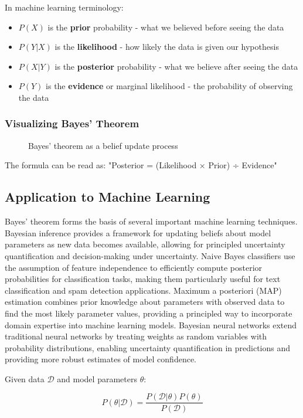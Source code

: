 In machine learning terminology:
\begin{itemize}
    \item $P(X)$ is the \textbf{prior} probability - what we believed before seeing the data
    \item $P(Y|X)$ is the \textbf{likelihood} - how likely the data is given our hypothesis
    \item $P(X|Y)$ is the \textbf{posterior} probability - what we believe after seeing the data
    \item $P(Y)$ is the \textbf{evidence} or marginal likelihood - the probability of observing the data
\end{itemize}

\subsubsection{Visualizing Bayes' Theorem}

\begin{figure}[h]
\centering
{}
\caption{Bayes' theorem as a belief update process}
\label{fig:bayes-process}
\end{figure}

The formula can be read as: "Posterior = (Likelihood × Prior) ÷ Evidence"

\subsection{Application to Machine Learning}

Bayes' theorem forms the basis of several important machine learning techniques. Bayesian inference provides a framework for updating beliefs about model parameters as new data becomes available, allowing for principled uncertainty quantification and decision-making under uncertainty. Naive Bayes classifiers use the assumption of feature independence to efficiently compute posterior probabilities for classification tasks, making them particularly useful for text classification and spam detection applications. Maximum a posteriori (MAP) estimation combines prior knowledge about parameters with observed data to find the most likely parameter values, providing a principled way to incorporate domain expertise into machine learning models. Bayesian neural networks extend traditional neural networks by treating weights as random variables with probability distributions, enabling uncertainty quantification in predictions and providing more robust estimates of model confidence.

Given data $\mathcal{D}$ and model parameters $\theta$:

\begin{equation}
P(\theta|\mathcal{D}) = \frac{P(\mathcal{D}|\theta)P(\theta)}{P(\mathcal{D})}
\end{equation}
